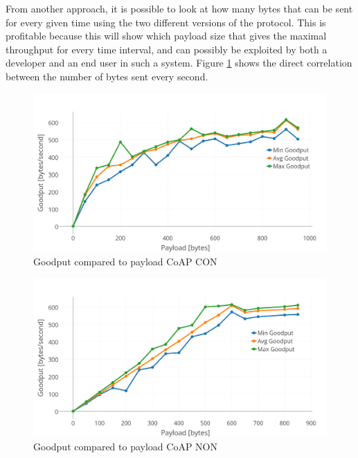 


\noindent From another approach, it is possible to look at how many bytes that can be sent for every given time using the two different versions of the protocol. This is profitable because this will show which payload size that gives the maximal \gls{throughput} for every time interval, and can possibly be exploited by both a developer and an end user in such a system. Figure \ref{fig:goodPayload_CON} shows the direct correlation between the number of bytes sent every second. 

\begin{figure}[ht]
    \centering
    \includegraphics[width=1.0\textwidth]{goodput_payload_CON.png}    
    \caption{Goodput compared to payload CoAP CON}
    \label{fig:goodPayload_CON}
\end{figure}

\begin{figure}[h!]
    \centering
    \includegraphics[width=1.0\textwidth]{goodput_payload_NON.png}    
    \caption{Goodput compared to payload CoAP NON}
    \label{fig:goodPayload_NON}
\end{figure}



